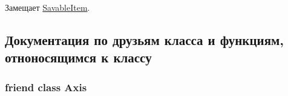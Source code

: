 Замещает \hyperlink{class_savable_item_a0da511a4854f515096f8f9b498f64158}{Savable\-Item}.



\subsection{Документация по друзьям класса и функциям, отноносящимся к классу}
\hypertarget{class_ticks_a9c05b17b809103942e6d7089d28f6db9}{
\subsubsection[{Axis}]{\setlength{\rightskip}{0pt plus 5cm}friend class {\bf Axis}\hspace{0.3cm}{\ttfamily [friend]}}}\label{class_ticks_a9c05b17b809103942e6d7089d28f6db9}



